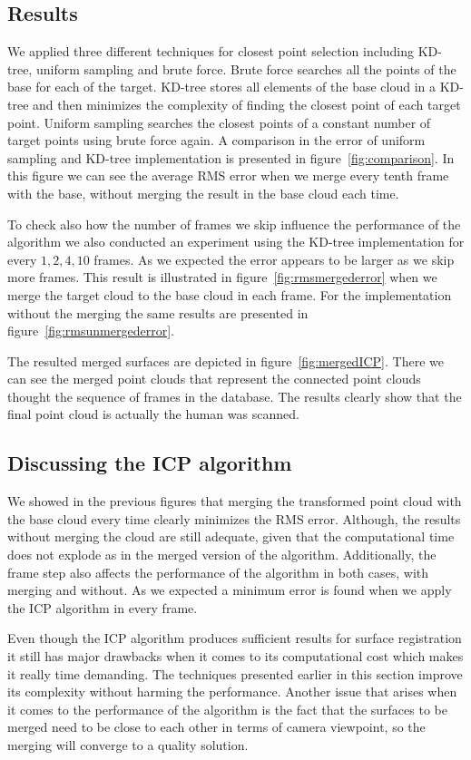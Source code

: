 \subsection{Results}
We applied three different techniques for closest point selection including KD-tree, uniform sampling and brute force. Brute force searches all the points of the base for each of the target. KD-tree stores all elements of the base cloud in a KD-tree and then minimizes the complexity of finding the closest point of each target point. Uniform sampling searches the closest points of a constant number of target points using brute force again. A comparison in the error of uniform sampling and KD-tree implementation is presented in figure~\ref{fig:comparison}. In this figure we can see the average RMS error when we merge every tenth frame with the base, without merging the result in the base cloud each time.

To check also how the number of frames we skip influence the performance of the algorithm we also conducted an experiment using the KD-tree implementation for every $1,2,4,10$ frames. As we expected the error appears to be larger as we skip more frames. This result is illustrated in figure~\ref{fig:rmsmergederror} when we merge the target cloud to the base cloud in each frame. For the implementation without the merging the same results are presented in figure~\ref{fig:rmsunmergederror}.

The resulted merged surfaces are depicted in figure~\ref{fig:mergedICP}. There we can see the merged point clouds that represent the connected point clouds thought the sequence of frames in the database. The results clearly show that the final point cloud is actually the human was scanned.


\subsection{Discussing the ICP algorithm}
We showed in the previous figures that merging the  transformed point cloud with the base cloud every time clearly minimizes the RMS error. Although, the results without merging the cloud are still adequate, given that the computational time does not explode as in the merged version of the algorithm. Additionally, the frame step also affects the performance of the algorithm in both cases, with merging and without. As we expected a minimum error is found when we apply the ICP algorithm in every frame.

Even though the ICP algorithm produces sufficient results for surface registration it still has major drawbacks when it comes to its computational cost which makes it really time demanding. The techniques presented earlier in this section improve its complexity without harming the performance. Another issue that arises when it comes to the performance of the algorithm is the fact that the surfaces to be merged need to be close to each other in terms of camera viewpoint, so the merging will converge to a quality solution.

